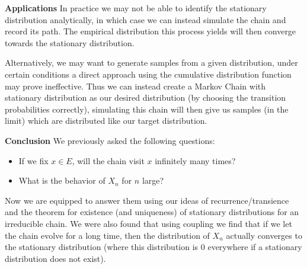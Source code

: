 {\color{blue}\textbf{Applications} 
	In practice we may not be able to identify the stationary distribution analytically, in which case we can instead simulate the chain and record its path. The empirical distribution this process yields will then converge towards the stationary distribution. 

	Alternatively, we may want to generate samples from a given distribution, under certain conditions a direct approach using the cumulative distribution function may prove ineffective. Thus we can instead create a Markov Chain with stationary distribution as our desired distribution (by choosing the transition probabilities correctly), simulating this chain will then give us samples (in the limit) which are distributed like our target distribution.
}

\noindent \textbf{Conclusion} We previously asked the following questions:
\begin{itemize}
	\item If we fix $x \in E$, will the chain visit $x$ infinitely many times?
	\item What is the behavior of $X_n$ for $n$ large?
\end{itemize}
Now we are equipped to answer them using our ideas of recurrence/transience and the theorem for existence (and uniqueness) of stationary distributions for an irreducible chain. We were also found that using coupling we find that if we let the chain evolve for a long time, then the distribution of $X_n$ actually converges to the stationary distribution (where this distribution is 0 everywhere if a stationary distribution does not exist).


